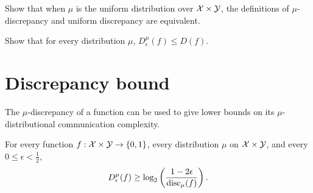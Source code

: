 \exercises

\begin{exercise}
	Show that when $\mu$ is the uniform distribution over $\mathcal{X} \times \mathcal{Y}$, the definitions of $\mu$-discrepancy and uniform discrepancy are equivalent.
\end{exercise}

\begin{exercise}
	Show that for every distribution $\mu$, $D^\mu_\epsilon(f) \le D(f)$.
\end{exercise}


\section{Discrepancy bound}

The $\mu$-discrepancy of a function can be used to give lower bounds on its $\mu$-distributional communication complexity.

\begin{lemma}
	For every function $f : \mathcal{X} \times \mathcal{Y} \to \{0,1\}$, every distribution $\mu$ on $\mathcal{X} \times \mathcal{Y}$, and every $0 \le \epsilon < \frac12$,
	\[
	D_\epsilon^{\mu}(f) \ge \log_2 \left( \frac{1-2\epsilon}{\mathrm{disc}_\mu(f)} \right).
	\]
\end{lemma}

